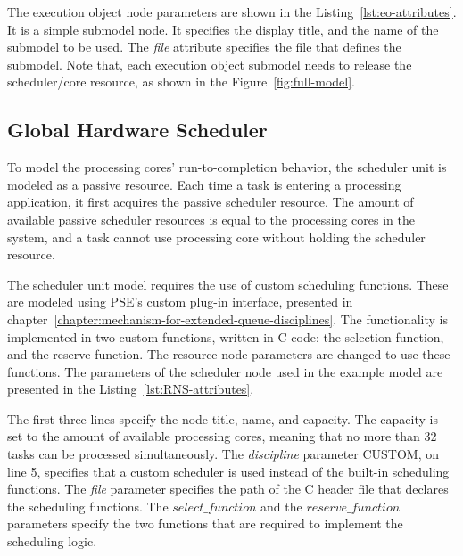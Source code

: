 

The execution object node parameters are shown in the Listing~\ref{lst:eo-attributes}. It is a simple submodel node. It specifies the display title, and the name of the submodel to be used. The \emph{file} attribute specifies the file that defines the submodel. Note that, each execution object submodel needs to release the scheduler/core resource, as shown in the Figure~\ref{fig:full-model}.

\subsection{Global Hardware Scheduler}
\label{sec:scheduler-unit}
To model the processing cores' run-to-completion behavior, the scheduler unit is modeled as a passive resource. Each time a task is entering a processing application, it first acquires the passive scheduler resource. The amount of available passive scheduler resources is equal to the processing cores in the system, and a task cannot use processing core without holding the scheduler resource.

The scheduler unit model requires the use of custom scheduling functions. These are modeled using PSE's custom plug-in interface, presented in chapter~\ref{chapter:mechanism-for-extended-queue-disciplines}. The functionality is implemented in two custom functions, written in C-code: the selection function, and the reserve function. The resource node parameters are changed to use these functions. The parameters of the scheduler node used in the example model are presented in the Listing~\ref{lst:RNS-attributes}.



The first three lines specify the node title, name, and capacity. The capacity is set to the amount of available processing cores, meaning that no more than 32 tasks can be processed simultaneously. The \emph{discipline} parameter \mbox{CUSTOM}, on line 5, specifies that a custom scheduler is used instead of the built-in scheduling functions. The \emph{file} parameter specifies the path of the C header file that declares the scheduling functions. The \emph{$select\_function$} and the \emph{$reserve\_function$} parameters specify the two functions that are required to implement the scheduling logic.

